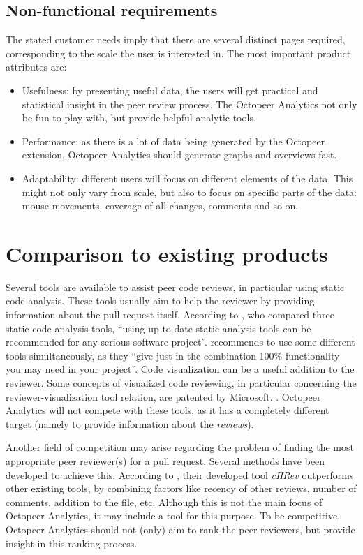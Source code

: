 \documentclass{article}
\begin{document}
\subsection{Non-functional requirements} \label{section:nonfunctionalrequirements}

The stated customer needs imply that there are several distinct pages required, corresponding to the scale the user is interested in. The most important product attributes are:
\begin{itemize}
\item Usefulness: by presenting useful data, the users will get practical and statistical insight in the peer review process. The Octopeer Analytics not only be fun to play with, but provide helpful analytic tools.
\item Performance: as there is a lot of data being generated by the Octopeer extension, Octopeer Analytics should generate graphs and overviews fast.
\item Adaptability: different users will focus on different elements of the data. This might not only vary from scale, but also to focus on specific parts of the data: mouse movements, coverage of all changes, comments and so on.
\end{itemize}

\section{Comparison to existing products} \label{section:comparisontoexistingproducts}
Several tools are available to assist peer code reviews, in particular using static code analysis. These tools usually aim to help the reviewer by providing information about the pull request itself. According to \cite{comparisonstatic}, who compared three static code analysis tools, ``using up-to-date static analysis tools can be recommended for any serious software project''. \cite{findbugscheckstyle} recommends to use some different tools simultaneously, as they ``give just in the combination 100\% functionality you may need in your project''. Code visualization can be a useful addition to the reviewer. Some concepts of visualized code reviewing, in particular concerning the reviewer-visualization tool relation, are patented by Microsoft. \parencite{wang2015visualized}. Octopeer Analytics will not compete with these tools, as it has a completely different target (namely to provide information about the \textit{reviews}).

Another field of competition may arise regarding the problem of finding the most appropriate peer reviewer(s) for a pull request. Several methods have been developed to achieve this. According to  \cite{automaticallyrecommending}, their developed tool \textit{cHRev} outperforms other existing tools, by combining factors like recency of other reviews, number of comments, addition to the file, etc. Although this is not the main focus of Octopeer Analytics, it may include a tool for this purpose. To be competitive, Octopeer Analytics should not (only) aim to rank the peer reviewers, but provide insight in this ranking process.
\end{document}
